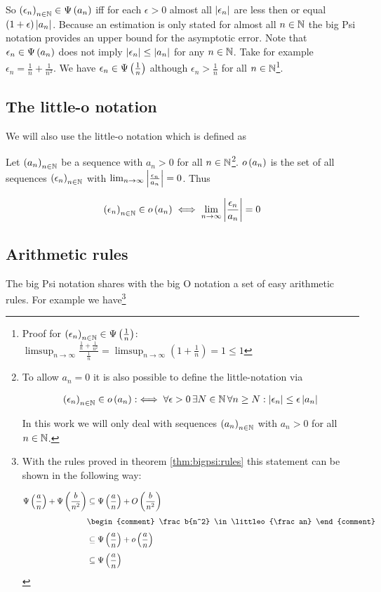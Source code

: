 So $\left({\epsilon_n}\right)_{{n}\in\mathbb N}\in\Psi\left( {a_n} \right)$ iff for each $\epsilon > 0$ almost all $\left|{\epsilon_n}\right|$ are less then or equal $(1+\epsilon)\left|{a_n}\right|$. Because an estimation is only stated for almost all $n\in\mathbb N$ the big Psi notation provides an upper bound for the asymptotic error. Note that $\epsilon_n\in\Psi\left( {a_n} \right)$ does not imply $\left|{\epsilon_n}\right|\le\left|{a_n}\right|$ for any $n\in\mathbb N$. Take for example $\epsilon_n = \frac 1n + \frac 1{n^2}$. We have $\epsilon_n \in \Psi\left( {\frac 1n} \right)$ although $\epsilon_n > \frac 1n$ for all $n\in\mathbb N$\footnote{Proof for $\left({\epsilon_n}\right)_{{n}\in\mathbb N} \in \Psi\left( {\frac 1n} \right)$: $\limsup_{n\to\infty} \frac{\frac 1n + \frac 1{n^2}}{\frac 1n} = \limsup_{n\to\infty} \left(1+\frac 1n\right) = 1 \le 1$}.

\subsection{The little-o notation}

We will also use the little-o notation which is defined as~\cite[pp.~99,~103]{aigner}\cite[p.~385]{hachenberger}\cite{wiki:bigo}

\begin{definition}
  Let $\left({a_n}\right)_{{n}\in\mathbb N}$ be a sequence with $a_n > 0$ for all $n\in\mathbb N$\footnote{To allow $a_n=0$ it is also possible to define the little-notation via~\cite[pp.~448]{graham}\cite{wiki:bigo}

  \begin{align}
    \left({\epsilon_n}\right)_{{n}\in\mathbb N}\in o\left( {a_n} \right) :\iff \forall \epsilon > 0\, \exists N\in\mathbb N\, \forall n \ge N: \left|{\epsilon_n}\right| \le \epsilon \left|{a_n}\right|
  \end{align}

  \noindent In this work we will only deal with sequences $\left({a_n}\right)_{{n}\in\mathbb N}$ with $a_n > 0$ for all $n\in\mathbb N$.
}. $o\left( {a_n} \right)$ is the set of all sequences $\left({\epsilon_n}\right)_{{n}\in\mathbb N}$ with $\lim_{n\to\infty} \left|{\frac{\epsilon_n}{a_n}}\right| = 0$. Thus

  \begin{align}
    \left({\epsilon_n}\right)_{{n}\in\mathbb N}\in o\left( {a_n} \right) \iff \lim_{n\to\infty} \left|{\frac{\epsilon_n}{a_n}}\right| = 0
  \end{align}
\end{definition}

\subsection{Arithmetic rules}

The big Psi notation shares with the big O notation a set of easy arithmetic rules. For example we have\footnote{With the rules proved in theorem \ref{thm:bigpsi:rules} this statement can be shown in the following way:

  \begin{align}
    \bigpsi{\frac an}+\bigpsi{\frac{b}{n^2}} & \subseteq \bigpsi{\frac an} + \bigo{\frac b{n^2}} \nl
    & \begin{comment}
      \frac b{n^2} \in \littleo{\frac an}
    \end{comment} \nl
    & \subseteq \bigpsi{\frac an} + \littleo{\frac an} \nl
    & \subseteq \bigpsi{\frac an}
  \end{align}
}

